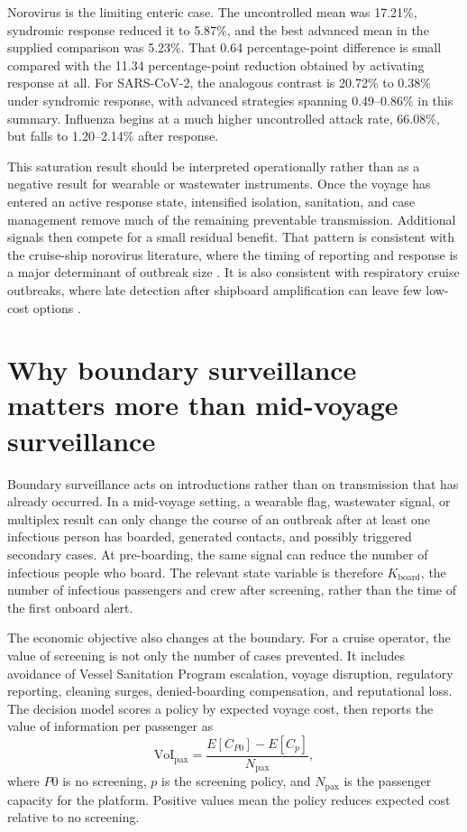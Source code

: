 Norovirus is the limiting enteric case.
The uncontrolled mean was 17.21\%, syndromic response reduced it to 5.87\%, and the best advanced
mean in the supplied comparison was 5.23\%.
That 0.64 percentage-point difference is small compared with the 11.34 percentage-point reduction
obtained by activating response at all.
For SARS-CoV-2, the analogous contrast is 20.72\% to 0.38\% under syndromic response, with advanced
strategies spanning 0.49--0.86\% in this summary.
Influenza begins at a much higher uncontrolled attack rate, 66.08\%, but falls to 1.20--2.14\%
after response.

This saturation result should be interpreted operationally rather than as a negative result for
wearable or wastewater instruments.
Once the voyage has entered an active response state, intensified isolation, sanitation, and case
management remove much of the remaining preventable transmission.
Additional signals then compete for a small residual benefit.
That pattern is consistent with the cruise-ship norovirus literature, where the timing of reporting
and response is a major determinant of outbreak size \citep{Jenkins2021,Mouchtouri2024,CDC_VSP2025}.
It is also consistent with respiratory cruise outbreaks, where late detection after shipboard
amplification can leave few low-cost options \citep{Yamagishi2020,Willebrand2022}.

\section{Why boundary surveillance matters more than mid-voyage surveillance}
Boundary surveillance acts on introductions rather than on transmission that has already occurred.
In a mid-voyage setting, a wearable flag, wastewater signal, or multiplex result can only change the
course of an outbreak after at least one infectious person has boarded, generated contacts, and
possibly triggered secondary cases.
At pre-boarding, the same signal can reduce the number of infectious people who board.
The relevant state variable is therefore $K_{\mathrm{board}}$, the number of infectious passengers
and crew after screening, rather than the time of the first onboard alert.

The economic objective also changes at the boundary.
For a cruise operator, the value of screening is not only the number of cases prevented.
It includes avoidance of Vessel Sanitation Program escalation, voyage disruption, regulatory
reporting, cleaning surges, denied-boarding compensation, and reputational loss.
The decision model scores a policy by expected voyage cost, then reports the value of information per passenger as
\begin{equation}
\mathrm{VoI}_{\mathrm{pax}} = \frac{E[C_{P0}] - E[C_{p}]}{N_{\mathrm{pax}}},
\end{equation}
where $P0$ is no screening, $p$ is the screening policy, and $N_{\mathrm{pax}}$ is the passenger
capacity for the platform.
Positive values mean the policy reduces expected cost relative to no screening.

